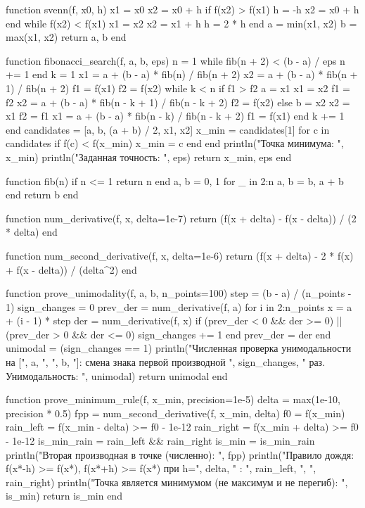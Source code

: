 \documentclass[a4paper, 14pt]{extarticle}
\begin{document}
\begin{breakablelisting}
function svenn(f, x0, h)
    x1 = x0
    x2 = x0 + h
    if f(x2) > f(x1)
        h = -h
        x2 = x0 + h
    end
    while f(x2) < f(x1)
        x1 = x2
        x2 = x1 + h
        h = 2 * h
    end
    a = min(x1, x2)
    b = max(x1, x2)
    return a, b
end

function fibonacci_search(f, a, b, eps)
    n = 1
    while fib(n + 2) < (b - a) / eps
        n += 1
    end
    k = 1
    x1 = a + (b - a) * fib(n) / fib(n + 2)
    x2 = a + (b - a) * fib(n + 1) / fib(n + 2)
    f1 = f(x1)
    f2 = f(x2)
    while k < n
        if f1 > f2
            a = x1
            x1 = x2
            f1 = f2
            x2 = a + (b - a) * fib(n - k + 1) / fib(n - k + 2)
            f2 = f(x2)
        else
            b = x2
            x2 = x1
            f2 = f1
            x1 = a + (b - a) * fib(n - k) / fib(n - k + 2)
            f1 = f(x1)
        end
        k += 1
    end
    candidates = [a, b, (a + b) / 2, x1, x2]
    x_min = candidates[1]
    for c in candidates
        if f(c) < f(x_min)
            x_min = c
        end
    end
    println("Точка минимума: ", x_min)
    println("Заданная точность: ", eps)
    return x_min, eps
end

function fib(n)
    if n <= 1
        return n
    end
    a, b = 0, 1
    for _ in 2:n
        a, b = b, a + b
    end
    return b
end

function num_derivative(f, x, delta=1e-7)
    return (f(x + delta) - f(x - delta)) / (2 * delta)
end

function num_second_derivative(f, x, delta=1e-6)
    return (f(x + delta) - 2 * f(x) + f(x - delta)) / (delta^2)
end

function prove_unimodality(f, a, b, n_points=100)
    step = (b - a) / (n_points - 1)
    sign_changes = 0
    prev_der = num_derivative(f, a)
    for i in 2:n_points
        x = a + (i - 1) * step
        der = num_derivative(f, x)
        if (prev_der < 0 && der >= 0) || (prev_der > 0 && der <= 0)
            sign_changes += 1
        end
        prev_der = der
    end
    unimodal = (sign_changes == 1)
    println("Численная проверка унимодальности на [", a, ", ", b, "]: смена знака первой производной ", sign_changes, " раз. Унимодальность: ", unimodal)
    return unimodal
end

function prove_minimum_rule(f, x_min, precision=1e-5)
    delta = max(1e-10, precision * 0.5)
    fpp = num_second_derivative(f, x_min, delta)
    f0 = f(x_min)
    rain_left = f(x_min - delta) >= f0 - 1e-12
    rain_right = f(x_min + delta) >= f0 - 1e-12
    is_min_rain = rain_left && rain_right
    is_min = is_min_rain
    println("Вторая производная в точке (численно): ", fpp)
    println("Правило дождя: f(x*-h) >= f(x*), f(x*+h) >= f(x*) при h=", delta, " : ", rain_left, ", ", rain_right)
    println("Точка является минимумом (не максимум и не перегиб): ", is_min)
    return is_min
end


\end{breakablelisting}
\end{document}
